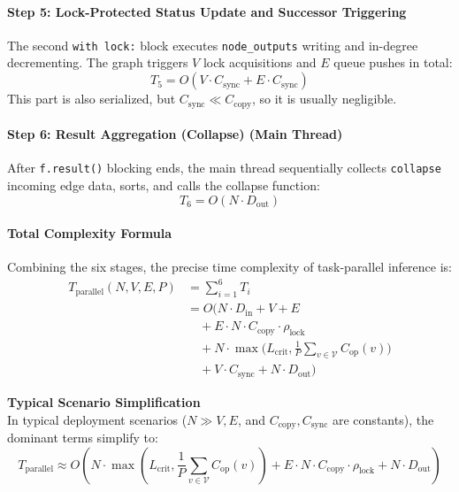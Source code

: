 \paragraph{Step 5: Lock-Protected Status Update and Successor Triggering}
The second \texttt{with lock:} block executes \texttt{node\_outputs} writing and in-degree decrementing. The graph triggers $V$ lock acquisitions and $E$ queue pushes in total:
\begin{equation}
    T_5 = O(V \cdot C_{\mathrm{sync}} + E \cdot C_{\mathrm{sync}})
\end{equation}
This part is also serialized, but $C_{\mathrm{sync}} \ll C_{\mathrm{copy}}$, so it is usually negligible.

\paragraph{Step 6: Result Aggregation (Collapse) (Main Thread)}
After \texttt{f.result()} blocking ends, the main thread sequentially collects \texttt{collapse} incoming edge data, sorts, and calls the collapse function:
\begin{equation}
    T_6 = O(N \cdot D_{\mathrm{out}})
\end{equation}

\paragraph{Total Complexity Formula}
Combining the six stages, the precise time complexity of task-parallel inference is:
\begin{equation}
\begin{aligned}
    T_{\mathrm{parallel}}(N, V, E, P) &= \sum_{i=1}^{6} T_i \\
    &= O\Big(N \cdot D_{\mathrm{in}} + V + E \\
    &\quad + E \cdot N \cdot C_{\mathrm{copy}} \cdot \rho_{\mathrm{lock}} \\
    &\quad + N \cdot \max\Big(L_{\mathrm{crit}}, \frac{1}{P} \sum_{v \in \mathcal{V}} C_{\mathrm{op}}(v)\Big) \\
    &\quad + V \cdot C_{\mathrm{sync}} + N \cdot D_{\mathrm{out}}\Big)
\end{aligned}
\end{equation}

\textbf{Typical Scenario Simplification} \\
In typical deployment scenarios ($N \gg V, E$, and $C_{\mathrm{copy}}, C_{\mathrm{sync}}$ are constants), the dominant terms simplify to:
\begin{equation}
    T_{\mathrm{parallel}} \approx O\left(N \cdot \max\left(L_{\mathrm{crit}}, \frac{1}{P} \sum_{v \in \mathcal{V}} C_{\mathrm{op}}(v)\right) + E \cdot N \cdot C_{\mathrm{copy}} \cdot \rho_{\mathrm{lock}} + N \cdot D_{\mathrm{out}}\right)
\end{equation}

